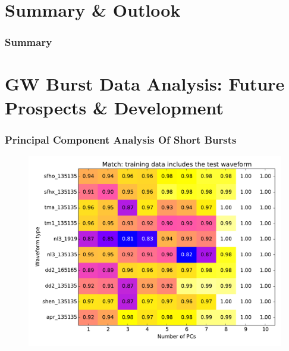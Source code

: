 \documentclass[serif,mathserif]{beamer}
\begin{document}
\section{Summary \& Outlook}
\begin{frame}
    \frametitle{Summary}
\end{frame}

\appendix
\section{GW Burst Data Analysis: Future Prospects \& Development}

\begin{frame}
    \frametitle{Principal Component Analysis Of Short Bursts}



        \begin{center}
            \vspace{-0.5cm}
            \begin{figure}
                \includegraphics[width=\columnwidth]{figures/match_grid_inctestwav.pdf}
            \end{figure}
        \end{center}

\end{frame}
\end{document}
